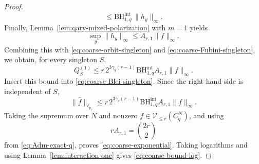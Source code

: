 \documentclass[10pt,a4paper]{amsart}
\newcommand{\BHint}[2]{\mathrm{BH}^{\mathrm{int}}_{#1,#2}}
\begin{document}
\begin{proof}
\[ \leq \BHint{1}{q}\,\|h_y\|_\infty.
\]
Finally, Lemma~\ref{lem:qary-mixed-polarization} with $m=1$ yields
\[
 \sup_y\|h_y\|_\infty\leq A_{r,1}\|f\|_\infty.
\]
Combining this with \eqref{eq:coarse-orbit-singleton} and
\eqref{eq:coarse-Fubini-singleton}, we obtain, for every singleton $S$,
\[
 Q_S^{(1)}
 \leq
 r\,2^{3\gamma_q(r-1)}\BHint{1}{q}A_{r,1}\|f\|_\infty.
\]
Insert this bound into \eqref{eq:coarse-Blei-singleton}.  Since the right-hand
side is independent of $S$,
\[
 \|\widehat f\|_{\ell_{p_r}}
 \leq
 r\,2^{3\gamma_q(r-1)}\BHint{1}{q}A_{r,1}\|f\|_\infty.
\]
Taking the supremum over $N$ and nonzero
$f\in\mathcal V_{\leq r}(C_q^N)$, and using
\[
 rA_{r,1}=\binom{2r}{2}
\]
from \eqref{eq:Adm-exact-q}, proves \eqref{eq:coarse-exponential}.  Taking
logarithms and using Lemma~\ref{lem:interaction-one} gives
\eqref{eq:coarse-bound-log}.
\end{proof}
\end{document}
